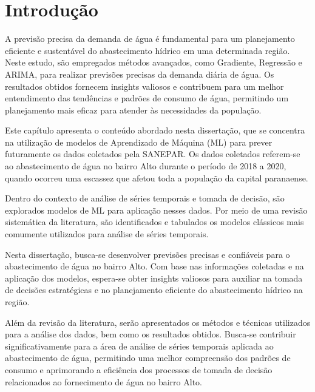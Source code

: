 

\section{Introdu{\c c}{\~a}o} \label{sec:int}


A previsão precisa da demanda de água é fundamental para um planejamento eficiente e sustentável do abastecimento hídrico em uma determinada região. Neste estudo, são empregados métodos avançados, como Gradiente, Regressão e ARIMA, para realizar previsões precisas da demanda diária de água. Os resultados obtidos fornecem insights valiosos e contribuem para um melhor entendimento das tendências e padrões de consumo de água, permitindo um planejamento mais eficaz para atender às necessidades da população.

Este capítulo apresenta o conteúdo abordado nesta dissertação, que se concentra na utilização de modelos de Aprendizado de Máquina (ML) para prever futuramente os dados coletados pela SANEPAR. Os dados coletados referem-se ao abastecimento de água no bairro Alto durante o período de 2018 a 2020, quando ocorreu uma escassez que afetou toda a população da capital paranaense.

Dentro do contexto de análise de séries temporais e tomada de decisão, são explorados modelos de ML para aplicação nesses dados. Por meio de uma revisão sistemática da literatura, são identificados e tabulados os modelos clássicos mais comumente utilizados para análise de séries temporais.

Nesta dissertação, busca-se desenvolver previsões precisas e confiáveis para o abastecimento de água no bairro Alto. Com base nas informações coletadas e na aplicação dos modelos, espera-se obter insights valiosos para auxiliar na tomada de decisões estratégicas e no planejamento eficiente do abastecimento hídrico na região.

Além da revisão da literatura, serão apresentados os métodos e técnicas utilizados para a análise dos dados, bem como os resultados obtidos. Busca-se contribuir significativamente para a área de análise de séries temporais aplicada ao abastecimento de água, permitindo uma melhor compreensão dos padrões de consumo e aprimorando a eficiência dos processos de tomada de decisão relacionados ao fornecimento de água no bairro Alto.


          

   

    

    

    